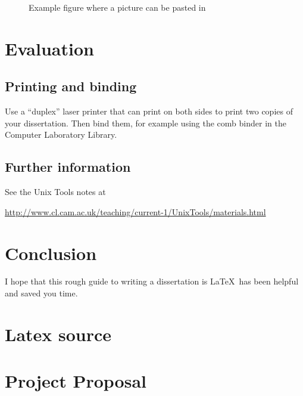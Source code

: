 \documentclass[12pt,a4paper,twoside,openright]{report}
\begin{document}
\begin{figure}[tbh]
\vspace{4in}
\caption{Example figure where a picture can be pasted in}
\label{pastedfig}
\end{figure}


\chapter{Evaluation}

\section{Printing and binding}

Use a ``duplex'' laser printer that can print on both sides to print
two copies of your dissertation. Then bind them, for example using the
comb binder in the Computer Laboratory Library.

\section{Further information}

See the Unix Tools notes at

\url{http://www.cl.cam.ac.uk/teaching/current-1/UnixTools/materials.html}


\chapter{Conclusion}

I hope that this rough guide to writing a dissertation is \LaTeX\ has
been helpful and saved you time.




\appendix

\chapter{Latex source}


\chapter{Project Proposal}
\end{document}
